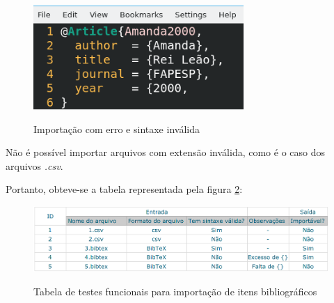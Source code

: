     \begin{figure}[H]
        \caption{Importação com erro e sintaxe inválida}
        \vspace{0.5cm}
        \centering
        \includegraphics[width=8cm]{images/exemplo_importacao_invalida.png}
        \label{figura:exemplo_importacao_invalida}
    \end{figure}

        Não é possível importar arquivos com extensão inválida, como é o caso dos arquivos \textit{.csv}.
        \newline
        \par Portanto, obteve-se a tabela representada pela figura \ref{figura:tabela_importacao}:
    
    \begin{figure}[H]
        \caption{Tabela de testes funcionais para importação de itens bibliográficos}
        \vspace{0.5cm}
        \centering
        \includegraphics[width=15cm]{images/tabela_importacao.png}
        \label{figura:tabela_importacao}
    \end{figure}
